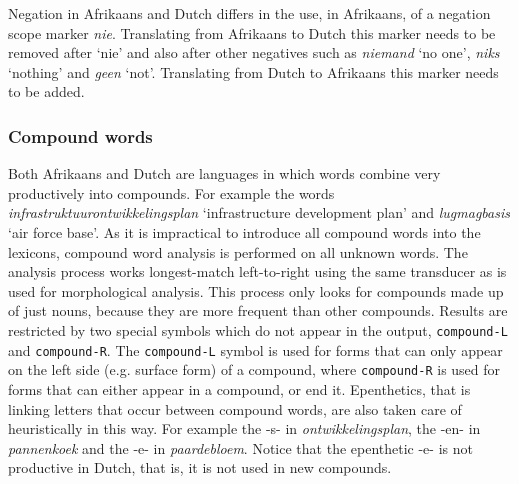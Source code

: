 \documentclass[11pt]{article}
\begin{document}
Negation in Afrikaans and Dutch differs in the use, in Afrikaans, of a negation scope 
marker {\em nie}. Translating from Afrikaans to Dutch this marker needs to be removed after `nie' and
also after other negatives such as {\em niemand} `no one', {\em niks} `nothing' and {\em geen} `not'. Translating from 
Dutch to Afrikaans this marker needs to be added.

\subsubsection{Compound words}


Both Afrikaans and Dutch are languages in which words combine very
productively into compounds. For example the words {\em infrastruktuurontwikkelingsplan}
`infrastructure development plan' and {\em lugmagbasis}
`air force base'. As it is impractical to introduce
all compound words into the lexicons, compound word analysis is performed on
all unknown words. The analysis process works longest-match left-to-right
using the same transducer as is used for morphological analysis. This process only
looks for compounds made up of just nouns, because they are more frequent than other compounds.
Results are restricted by two special
symbols which do not appear in the output, {\small {\tt compound-L}} and {\small {\tt compound-R}}.
The {\small {\tt compound-L}} symbol is used for forms that can only appear on the
left side (e.g. surface form) of a compound, where {\small {\tt compound-R}} is
used for forms that can either appear in a compound, or end it.
Epenthetics, that is linking letters that occur between compound words,
are also taken care of heuristically in this way. For example the -s-
in \emph{ontwikkelingsplan}, the -en- in \emph{pannenkoek} and the -e- in \emph{paardebloem}.
Notice that the epenthetic -e- is not productive in Dutch, that is, it is not used 
in new compounds.

%
%
%
\end{document}
